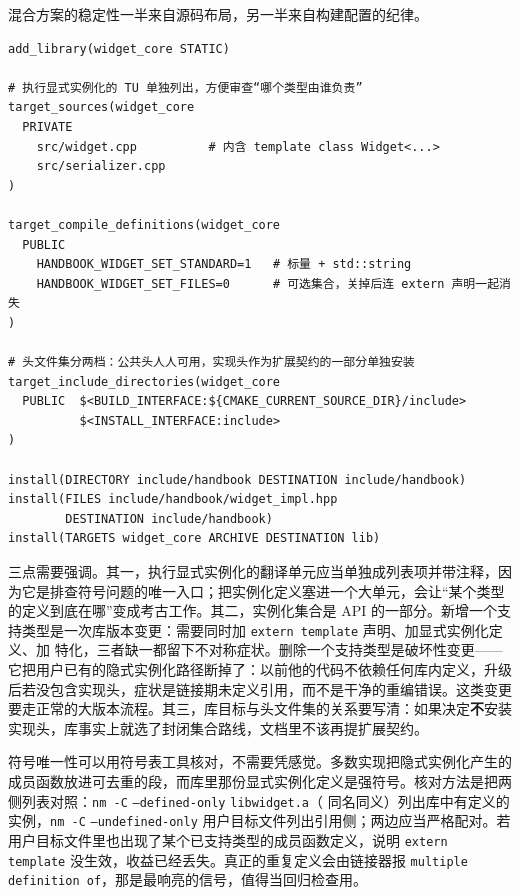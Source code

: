 \documentclass[12pt,a4paper,fontset=fandol]{ctexbook}
\newcommand{\kw}[1]{\texttt{#1}}
\newcommand{\seqkw}[1]{\seqsplit{\texttt{#1}}}
\begin{document}
混合方案的稳定性一半来自源码布局，另一半来自构建配置的纪律。

\begin{lstlisting}[style=cmakestyle,caption={构建与安装：实例化单元单独成列表、编译定义控制集合、头文件集分档}]
add_library(widget_core STATIC)

# 执行显式实例化的 TU 单独列出，方便审查“哪个类型由谁负责”
target_sources(widget_core
  PRIVATE
    src/widget.cpp          # 内含 template class Widget<...>
    src/serializer.cpp
)

target_compile_definitions(widget_core
  PUBLIC
    HANDBOOK_WIDGET_SET_STANDARD=1   # 标量 + std::string
    HANDBOOK_WIDGET_SET_FILES=0      # 可选集合，关掉后连 extern 声明一起消失
)

# 头文件集分两档：公共头人人可用，实现头作为扩展契约的一部分单独安装
target_include_directories(widget_core
  PUBLIC  $<BUILD_INTERFACE:${CMAKE_CURRENT_SOURCE_DIR}/include>
          $<INSTALL_INTERFACE:include>
)

install(DIRECTORY include/handbook DESTINATION include/handbook)
install(FILES include/handbook/widget_impl.hpp
        DESTINATION include/handbook)
install(TARGETS widget_core ARCHIVE DESTINATION lib)
\end{lstlisting}

三点需要强调。其一，执行显式实例化的翻译单元应当单独成列表项并带注释，因为它是排查符号问题的唯一入口；把实例化定义塞进一个大单元，会让“某个类型的定义到底在哪”变成考古工作。其二，实例化集合是 API 的一部分。新增一个支持类型是一次库版本变更：需要同时加 \kw{extern template} 声明、加显式实例化定义、加 \seqkw{is\_preinstantiated} 特化，三者缺一都留下不对称症状。删除一个支持类型是破坏性变更——它把用户已有的隐式实例化路径断掉了：以前他的代码不依赖任何库内定义，升级后若没包含实现头，症状是链接期未定义引用，而不是干净的重编错误。这类变更要走正常的大版本流程。其三，库目标与头文件集的关系要写清：如果决定\textbf{不}安装实现头，库事实上就选了封闭集合路线，文档里不该再提扩展契约。

符号唯一性可以用符号表工具核对，不需要凭感觉。多数实现把隐式实例化产生的成员函数放进可去重的段，而库里那份显式实例化定义是强符号。核对方法是把两侧列表对照：\kw{nm -C} \kw{--defined-only} \kw{libwidget.a}（\seqkw{llvm-nm} 同名同义）列出库中有定义的实例，\kw{nm -C} \kw{--undefined-only} 用户目标文件列出引用侧；两边应当严格配对。若用户目标文件里也出现了某个已支持类型的成员函数定义，说明 \kw{extern template} 没生效，收益已经丢失。真正的重复定义会由链接器报 \kw{multiple definition of}，那是最响亮的信号，值得当回归检查用。
\end{document}
